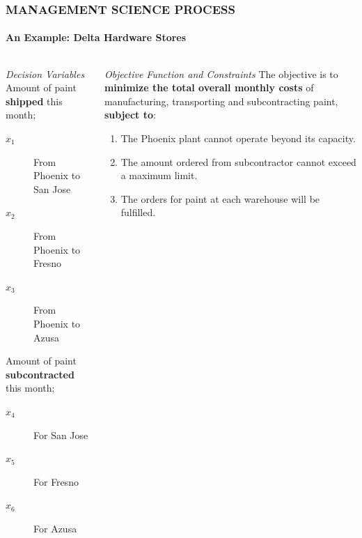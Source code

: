 \documentclass[14 pt]{beamer}
\begin{document}
\begin{frame}[t]
\frametitle{MANAGEMENT SCIENCE PROCESS}
\framesubtitle{An Example: Delta Hardware Stores}

\begin{columns}[t]
\begin{column}{0.45\textwidth}
\emph{Decision Variables}
\vskip0.5cm%
Amount of paint \textbf{shipped} this month;
\begin{description}
  \item [$x_1$] From Phoenix to San Jose
  \item [$x_2$] From Phoenix to Fresno
  \item [$x_3$] From Phoenix to Azusa
\end{description}
\vskip0.5cm%
Amount of paint \textbf{subcontracted} this month;
\begin{description}
  \item [$x_4$] For San Jose
  \item [$x_5$] For Fresno
  \item [$x_6$] For Azusa
\end{description}
\end{column}

\begin{column}{0.45\textwidth}
\emph{Objective Function and Constraints}
\vskip0.5cm%
The objective is to \textbf{minimize the total overall monthly costs} of manufacturing, transporting and subcontracting paint, \textbf{subject to}:
\begin{enumerate}
  \item The Phoenix plant cannot operate beyond its capacity.
  \item The amount ordered from subcontractor cannot exceed a maximum limit.
  \item The orders for paint at each warehouse will be fulfilled.
\end{enumerate}
\end{column}
\end{columns}
\end{frame}

\end{document}
